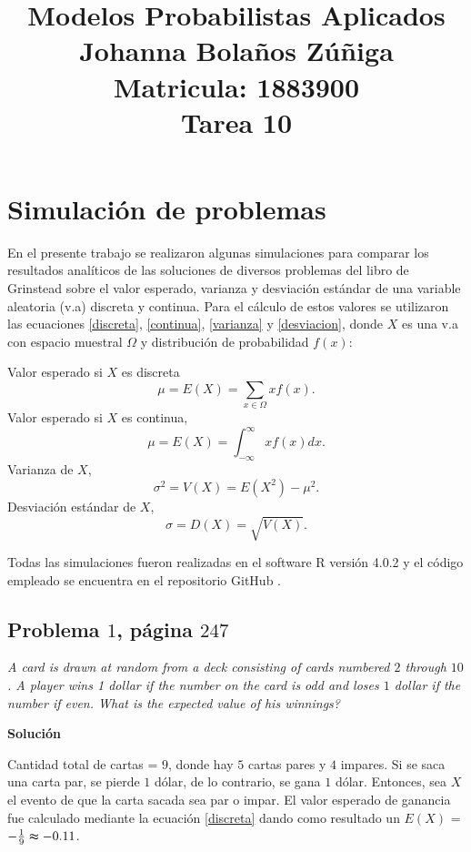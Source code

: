 \documentclass{article}
\title{
\centering
Modelos Probabilistas Aplicados \\
Johanna Bolaños Zúñiga \\
Matricula: 1883900\\
Tarea 10
}
\date{}
\begin{document}
\maketitle

\section{Simulación de problemas}
En el presente trabajo se realizaron algunas simulaciones para comparar los resultados analíticos de las soluciones de diversos problemas del libro de Grinstead \cite{librop} sobre el valor esperado, varianza y desviación estándar de una variable aleatoria (v.a) discreta y continua. Para el cálculo de estos valores se utilizaron las ecuaciones \ref{discreta}, \ref{continua}, \ref{varianza} y \ref{desviacion}, donde $X$ es una v.a con espacio muestral $\Omega$ y distribución de probabilidad $f{(x)}$:

\noindent Valor esperado si $X$ es discreta 
\begin{equation}
\mu = E{(X)} = \sum_{x \in \Omega}xf(x).
\label{discreta}
\end{equation}
\noindent Valor esperado si $X$ es continua,
\begin{equation}
\mu = E{(X)} = \int_{-\infty}^{\infty}xf(x)dx.
\label{continua}
\end{equation}
\noindent Varianza de $X$,
\begin{equation}
\sigma^2 = V(X)= E{(X^2)} - \mu^2.
\label{varianza}
\end{equation}
\noindent Desviación estándar de $X$,
\begin{equation}
\sigma = D(X)= \sqrt{V(X)}.
\label{desviacion}
\end{equation}

Todas las simulaciones fueron realizadas en el software R versión 4.0.2 \cite{r} y el código empleado se encuentra en el repositorio GitHub \cite{github}.

\subsection{Problema $1$, página $247$} \label{problema1}
\textit{A card is drawn at random from a deck consisting of cards numbered $2$ through $10$. A player wins 1 dollar if the number on the card is odd and loses $1$ dollar if the number if even. What is the expected value of his winnings?}

\noindent \textbf{Solución}

Cantidad total de cartas = $9$, donde hay $5$ cartas pares y $4$ impares. Si se saca una carta par, se pierde $1$ dólar, de lo contrario, se gana $1$ dólar. Entonces, sea $X$ el evento de que la carta sacada sea par o impar. El valor esperado de ganancia fue calculado mediante la ecuación \ref{discreta} dando como resultado un $E{(X)}$ = $-\frac{1}{9} \thickapprox -0.11$.
\end{document}

